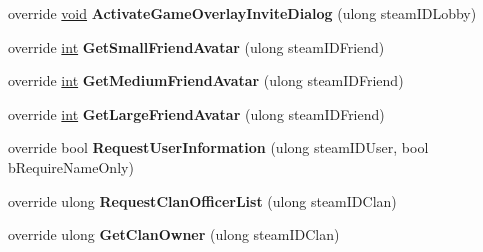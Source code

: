\begin{DoxyCompactItemize}
\item 
\hypertarget{classValve_1_1Steamworks_1_1CSteamFriends_aa398f556f853c5245974a5f3e788a5d5}{}override \hyperlink{SDL__audio_8h_a52835ae37c4bb905b903cbaf5d04b05f}{void} {\bfseries Activate\+Game\+Overlay\+Invite\+Dialog} (ulong steam\+I\+D\+Lobby)\label{classValve_1_1Steamworks_1_1CSteamFriends_aa398f556f853c5245974a5f3e788a5d5}

\item 
\hypertarget{classValve_1_1Steamworks_1_1CSteamFriends_a27d112bae7e75881f10beff57da857f6}{}override \hyperlink{SDL__thread_8h_a6a64f9be4433e4de6e2f2f548cf3c08e}{int} {\bfseries Get\+Small\+Friend\+Avatar} (ulong steam\+I\+D\+Friend)\label{classValve_1_1Steamworks_1_1CSteamFriends_a27d112bae7e75881f10beff57da857f6}

\item 
\hypertarget{classValve_1_1Steamworks_1_1CSteamFriends_af7ae4bfa2d8d9f6b6ce8ee62cbdb734f}{}override \hyperlink{SDL__thread_8h_a6a64f9be4433e4de6e2f2f548cf3c08e}{int} {\bfseries Get\+Medium\+Friend\+Avatar} (ulong steam\+I\+D\+Friend)\label{classValve_1_1Steamworks_1_1CSteamFriends_af7ae4bfa2d8d9f6b6ce8ee62cbdb734f}

\item 
\hypertarget{classValve_1_1Steamworks_1_1CSteamFriends_a360d079cb107e57b445509f2c694fac2}{}override \hyperlink{SDL__thread_8h_a6a64f9be4433e4de6e2f2f548cf3c08e}{int} {\bfseries Get\+Large\+Friend\+Avatar} (ulong steam\+I\+D\+Friend)\label{classValve_1_1Steamworks_1_1CSteamFriends_a360d079cb107e57b445509f2c694fac2}

\item 
\hypertarget{classValve_1_1Steamworks_1_1CSteamFriends_a08ec6ab8175bde64f87a267ba51c8deb}{}override bool {\bfseries Request\+User\+Information} (ulong steam\+I\+D\+User, bool b\+Require\+Name\+Only)\label{classValve_1_1Steamworks_1_1CSteamFriends_a08ec6ab8175bde64f87a267ba51c8deb}

\item 
\hypertarget{classValve_1_1Steamworks_1_1CSteamFriends_af5b99aef7c4a878549ba4b5702faa779}{}override ulong {\bfseries Request\+Clan\+Officer\+List} (ulong steam\+I\+D\+Clan)\label{classValve_1_1Steamworks_1_1CSteamFriends_af5b99aef7c4a878549ba4b5702faa779}

\item 
\hypertarget{classValve_1_1Steamworks_1_1CSteamFriends_a17864a093a9d03ebfce523a2fa563708}{}override ulong {\bfseries Get\+Clan\+Owner} (ulong steam\+I\+D\+Clan)\label{classValve_1_1Steamworks_1_1CSteamFriends_a17864a093a9d03ebfce523a2fa563708}


\end{DoxyCompactItemize}
